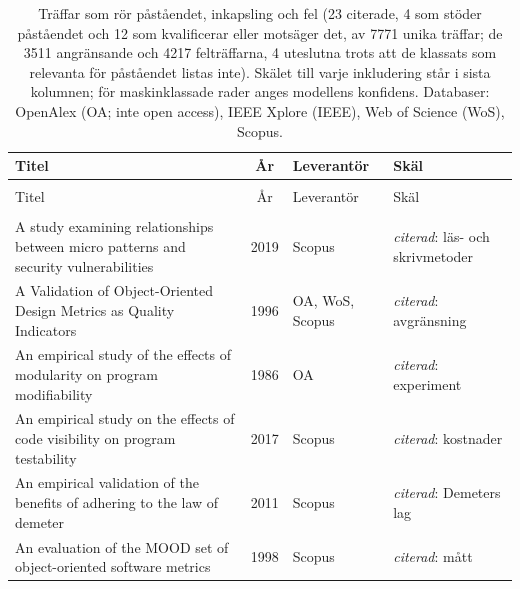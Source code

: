
\begingroup\footnotesize
\begin{longtable}{@{}%
  >{\raggedright\arraybackslash}p{}c%
  >{\raggedright\arraybackslash}p{}%
  >{\raggedright\arraybackslash}p{}@{}}
\caption{Träffar som rör påståendet, inkapsling och fel (23 citerade, 4 som stöder påståendet och 12 som kvalificerar eller motsäger det, av 7771 unika träffar; de 3511 angränsande och 4217 felträffarna, 4 uteslutna trots att de klassats som relevanta för påståendet listas inte). Skälet till varje inkludering står i sista kolumnen; för maskinklassade rader anges modellens konfidens. Databaser: OpenAlex (OA; inte open access), IEEE Xplore (IEEE), Web of Science (WoS), Scopus.}\label{tab:sok-inkapsling-fel}\\
\toprule
Titel & År & Leverantör & Skäl \\
\midrule
\endfirsthead
\multicolumn{4}{@{}l}{\emph{\tablename~\thetable{} (forts.)}}\\
\toprule
Titel & År & Leverantör & Skäl \\
\midrule
\endhead
\midrule \multicolumn{4}{r@{}}{\emph{forts.\ på nästa sida}}\\
\endfoot
\bottomrule
\endlastfoot
A study examining relationships between micro patterns and security vulnerabilities & 2019 & Scopus & \emph{citerad}: läs- och skrivmetoder \\
A Validation of Object-Oriented Design Metrics as Quality Indicators & 1996 & OA, WoS, Scopus & \emph{citerad}: avgränsning \\
An empirical study of the effects of modularity on program modifiability & 1986 & OA & \emph{citerad}: experiment \\
An empirical study on the effects of code visibility on program testability & 2017 & Scopus & \emph{citerad}: kostnader \\
An empirical validation of the benefits of adhering to the law of demeter & 2011 & Scopus & \emph{citerad}: Demeters lag \\
An evaluation of the MOOD set of object-oriented software metrics & 1998 & Scopus & \emph{citerad}: mått \\

\end{longtable}
